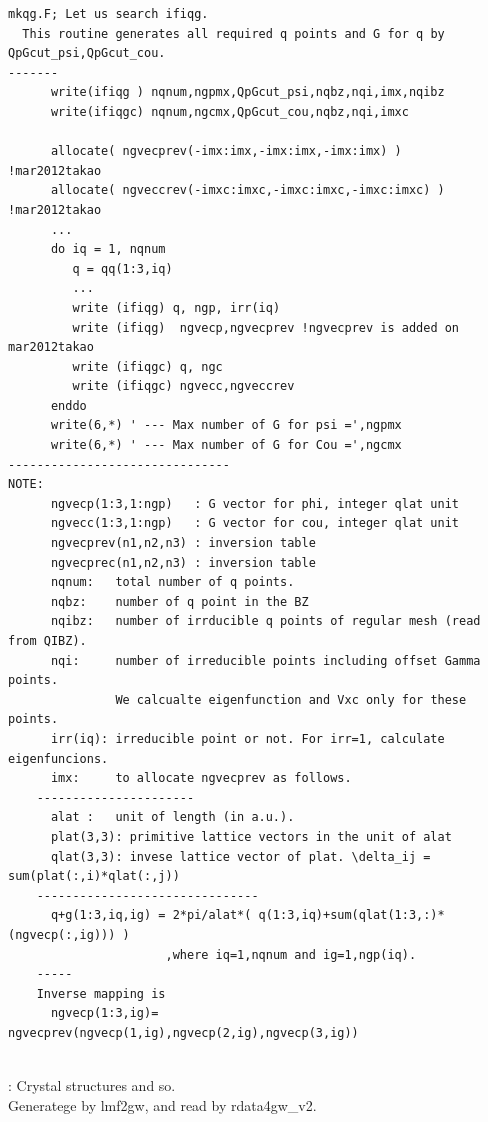 \documentclass[a4paper,10pt,epsf,fleqn]{article}
\newcommand{\fl}[1]{\noindent{\sf $\bullet$ #1\index{\sf #1}} : }
\begin{document}
\begin{verbatim}
mkqg.F; Let us search ifiqg.
  This routine generates all required q points and G for q by QpGcut_psi,QpGcut_cou.
-------
      write(ifiqg ) nqnum,ngpmx,QpGcut_psi,nqbz,nqi,imx,nqibz
      write(ifiqgc) nqnum,ngcmx,QpGcut_cou,nqbz,nqi,imxc

      allocate( ngvecprev(-imx:imx,-imx:imx,-imx:imx) )       !mar2012takao
      allocate( ngveccrev(-imxc:imxc,-imxc:imxc,-imxc:imxc) ) !mar2012takao
      ...
      do iq = 1, nqnum
         q = qq(1:3,iq)
         ...
         write (ifiqg) q, ngp, irr(iq)
         write (ifiqg)  ngvecp,ngvecprev !ngvecprev is added on mar2012takao
         write (ifiqgc) q, ngc
         write (ifiqgc) ngvecc,ngveccrev
      enddo
      write(6,*) ' --- Max number of G for psi =',ngpmx
      write(6,*) ' --- Max number of G for Cou =',ngcmx
-------------------------------
NOTE:
      ngvecp(1:3,1:ngp)   : G vector for phi, integer qlat unit
      ngvecc(1:3,1:ngp)   : G vector for cou, integer qlat unit
      ngvecprev(n1,n2,n3) : inversion table
      ngvecprec(n1,n2,n3) : inversion table
      nqnum:   total number of q points.
      nqbz:    number of q point in the BZ
      nqibz:   number of irrducible q points of regular mesh (read from QIBZ).
      nqi:     number of irreducible points including offset Gamma points. 
               We calcualte eigenfunction and Vxc only for these points.
      irr(iq): irreducible point or not. For irr=1, calculate eigenfuncions.
      imx:     to allocate ngvecprev as follows.
    ----------------------
      alat :   unit of length (in a.u.).
      plat(3,3): primitive lattice vectors in the unit of alat
      qlat(3,3): invese lattice vector of plat. \delta_ij = sum(plat(:,i)*qlat(:,j))
    -------------------------------
      q+g(1:3,iq,ig) = 2*pi/alat*( q(1:3,iq)+sum(qlat(1:3,:)*(ngvecp(:,ig))) )
                      ,where iq=1,nqnum and ig=1,ngp(iq).
    -----
    Inverse mapping is
      ngvecp(1:3,ig)= ngvecprev(ngvecp(1,ig),ngvecp(2,ig),ngvecp(3,ig))
\end{verbatim}
\ \\


\fl{DATA4GW\_V2} Crystal structures and so.\\
Generatege by lmf2gw, and read by rdata4gw\_v2.
\end{document}
